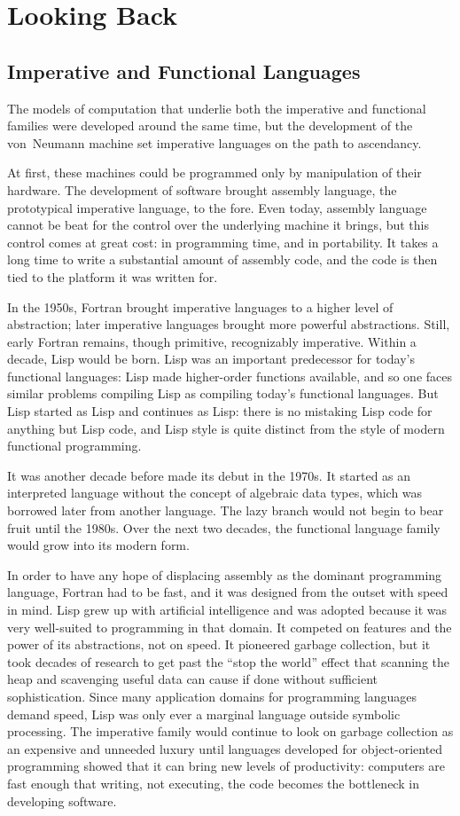 \section*{Looking Back}\label{conclusion:back}
\subsection*{Imperative and Functional Languages}
The models of computation that underlie both the imperative and functional families were developed around the same time, but the development of the von~Neumann machine set imperative languages on the path to ascendancy.

At first, these machines could be programmed only by manipulation of their hardware. The development of software brought assembly language, the prototypical imperative language, to the fore. Even today, assembly language cannot be beat for the control over the underlying machine it brings, but this control comes at great cost: in programming time, and in portability. It takes a long time to write a substantial amount of assembly code, and the code is then tied to the platform it was written for.

In the 1950s, Fortran brought imperative languages to a higher level of abstraction; later imperative languages brought more powerful abstractions. Still, early Fortran remains, though primitive, recognizably imperative. Within a decade, Lisp would be born. Lisp was an important predecessor for today's functional languages: Lisp made higher-order functions available, and so one faces similar problems compiling Lisp as compiling today's functional languages. But Lisp started as Lisp and continues as Lisp: there is no mistaking Lisp code for anything but Lisp code, and Lisp style is quite distinct from the style of modern functional programming.

It was another decade before \ML made its debut in the 1970s. It started as an interpreted language without the concept of algebraic data types, which was borrowed later from another language. The lazy branch would not begin to bear fruit until the 1980s. Over the next two decades, the functional language family would grow into its modern form.

In order to have any hope of displacing assembly as the dominant programming language, Fortran had to be fast, and it was designed from the outset with speed in mind. Lisp grew up with artificial intelligence and was adopted because it was very well-suited to programming in that domain. It competed on features and the power of its abstractions, not on speed. It pioneered garbage collection, but it took decades of research to get past the ``stop the world'' effect that scanning the heap and scavenging useful data can cause if done without sufficient sophistication. Since many application domains for programming languages demand speed, Lisp was only ever a marginal language outside symbolic processing. The imperative family would continue to look on garbage collection as an expensive and unneeded luxury until languages developed for object-oriented programming showed that it can bring new levels of productivity: computers are fast enough that writing, not executing, the code becomes the bottleneck in developing software.

